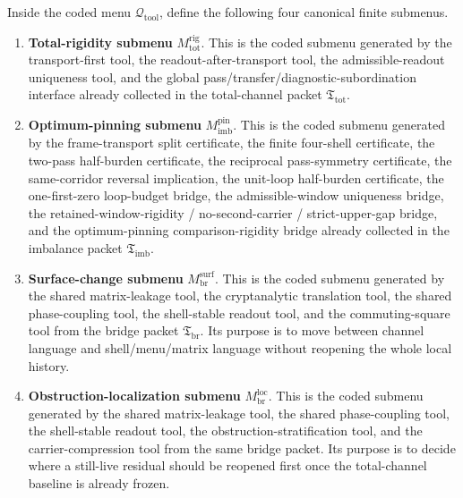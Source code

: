 \begin{definition}
\label{def:first-canonical-finite-submenus-qtool}
Inside the coded menu \(\mathcal Q_{\mathrm{tool}}\), define the following four canonical finite submenus.
\begin{enumerate}[leftmargin=2em]
 \item \textbf{Total-rigidity submenu} \(M^{\mathrm{rig}}_{\mathrm{tot}}\). This is the coded submenu generated by the transport-first tool, the readout-after-transport tool, the admissible-readout uniqueness tool, and the global pass/transfer/diagnostic-subordination interface already collected in the total-channel packet \(\mathfrak T_{\mathrm{tot}}\).

 \item \textbf{Optimum-pinning submenu} \(M^{\mathrm{pin}}_{\mathrm{imb}}\). This is the coded submenu generated by the frame-transport split certificate, the finite four-shell certificate, the two-pass half-burden certificate, the reciprocal pass-symmetry certificate, the same-corridor reversal implication, the unit-loop half-burden certificate, the one-first-zero loop-budget bridge, the admissible-window uniqueness bridge, the retained-window-rigidity / no-second-carrier / strict-upper-gap bridge, and the optimum-pinning comparison-rigidity bridge already collected in the imbalance packet \(\mathfrak T_{\mathrm{imb}}\).

 \item \textbf{Surface-change submenu} \(M^{\mathrm{surf}}_{\mathrm{br}}\). This is the coded submenu generated by the shared matrix-leakage tool, the cryptanalytic translation tool, the shared phase-coupling tool, the shell-stable readout tool, and the commuting-square tool from the bridge packet \(\mathfrak T_{\mathrm{br}}\). Its purpose is to move between channel language and shell/menu/matrix language without reopening the whole local history.

 \item \textbf{Obstruction-localization submenu} \(M^{\mathrm{loc}}_{\mathrm{br}}\). This is the coded submenu generated by the shared matrix-leakage tool, the shared phase-coupling tool, the shell-stable readout tool, the obstruction-stratification tool, and the carrier-compression tool from the same bridge packet. Its purpose is to decide where a still-live residual should be reopened first once the total-channel baseline is already frozen.
\end{enumerate}
\end{definition}

